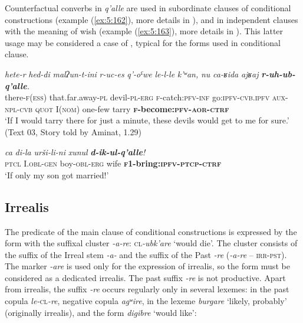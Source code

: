 ﻿\documentclass[output=paper]{langsci/langscibook}
\begin{document}
\pagebreak


Counterfactual converbs in \emph{q'alle} are used in subordinate clauses
of conditional constructions (example (\ref{ex:5:162}), more details in
), and in independent clauses with the meaning of wish (example (\ref{ex:5:163}),
more details in ). This latter usage may be considered a case
of , typical for the forms used in conditional clause.


\ea \label{ex:5:162} %
\gll \emph{hete-r} \emph{hed-di} \emph{malʔun-t-ini} \emph{r-uc-es} \emph{q'-oˤwe} \emph{le-l-le} \emph{k'ʷan,} \emph{nu} \emph{ca-ʁida} \emph{ajʁaj} \emph{\textbf{r-uh-ub-q'alle}.}\\
 there-\textsc{f}(\textsc{ess}) that.far.away-\textsc{pl} devil-\textsc{pl}-\textsc{erg}  \textsc{f}-catch:\textsc{pfv}-\textsc{inf} go:\textsc{ipfv}-\textsc{cvb.ipfv} \textsc{aux}-\textsc{npl}-\textsc{cvb} \textsc{quot} I(\textsc{nom}) one-few tarry \textbf{\textsc{f}-become:\textsc{pfv}-\textsc{aor}-\textsc{ctrf}} \\
\glt `If I would tarry there for just a minute, these devils would get to me
for sure.' (Text 03, Story told by Aminat, 1.29)

\ex \label{ex:5:163} %
\gll \emph{ca} \emph{di-la} \emph{urši-li-ni} \emph{xunul} \emph{\textbf{d-ik-ul-q'alle}!}\\
 \textsc{ptcl} I.\textsc{obl}-\textsc{gen} boy-\textsc{obl}-\textsc{erg} wife \textbf{\textsc{f1}-bring:\textsc{ipfv}-\textsc{ptcp}-\textsc{ctrf}}\\
\glt `If only my son got married!'
\z

\removelastskip
{}


\subsection{Irrealis}\label{irrealis}

The predicate of the main clause of conditional constructions is
expressed by the form with the suffixal cluster \emph{-a-re}:
\textsc{cl}\emph{-ubk'are} `would die'. The cluster consists of the suffix of the
Irreal stem \emph{-a-} and the suffix of the Past \emph{-re}
(\emph{-a-re} – \textsc{irr}-\textsc{pst}). The marker \emph{-are} is used only for the
expression of irrealis, so the form must be considered as a dedicated
irrealis. The past suffix \emph{-re} is not productive. Apart from
irrealis, the suffix \emph{-re} occurs regularly only in several
lexemes: in the past copula \emph{le-}\textsc{cl}\emph{-re}, negative copula
\emph{agʷire}, in the lexeme \emph{burgare} `likely,
probably' (originally irrealis), and the form \emph{digibre} `would
like':
\end{document}
